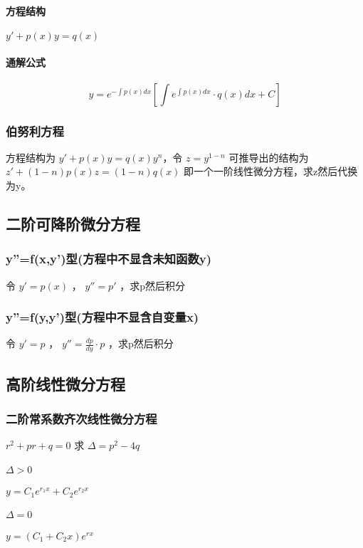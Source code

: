 ﻿\documentclass[a4paper,12pt,UTF8]{ctexart}
\begin{document}
    \paragraph{方程结构}\(y'+p(x)y=q(x)\)
    \paragraph{通解公式}
    \[y=e^{-\int p(x)dx}\left[\int e^{\int p(x)dx} \cdot q(x)dx+C\right]\]

    \subsubsection{伯努利方程}
    方程结构为 \(y'+p(x)y=q(x)y^{n}\)，令 \(z=y^{1-n}\) 可推导出的结构为 \(z'+(1-n)p(x)z=(1-n)q(x)\) 即一个一阶线性微分方程，求z然后代换为y。
    
    \subsection{二阶可降阶微分方程}
    
    \subsubsection{y''=f(x,y')型(方程中不显含未知函数y)}
    令 \(y'=p(x)\) ， \(y''=p'\) ，求p然后积分 
    
    \subsubsection{y''=f(y,y')型(方程中不显含自变量x)}
    令 \(y'=p\) ， \(y''=\frac{dp}{dy} \cdot p\) ，求p然后积分  
    
    \subsection{高阶线性微分方程}
    
    \subsubsection{二阶常系数齐次线性微分方程}
    \(r^2+pr+q=0\) 求 \(\Delta=p^2-4q\)
    \paragraph{\(\Delta>0\)} \(y=C_1e^{r_1x}+C_2e^{r_2x}\)
    \paragraph{\(\Delta=0\)} \(y=(C_1+C_2x)e^{rx}\)
\end{document}
